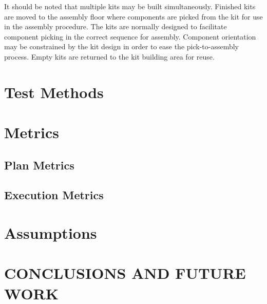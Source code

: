 It should be noted that multiple kits may be built simultaneously. 
Finished kits are moved to the assembly floor where components
are picked from the kit for use in the assembly procedure. 
The kits are normally designed to facilitate component picking in the correct
sequence for assembly. Component orientation may be constrained 
by the kit design in order to ease the pick-to-assembly process.
Empty kits are returned to the kit building area for reuse.

\renewcommand{\topfraction}{1.0}
\setcounter{topnumber}{100}

\section{Test Methods}
\label{sect:TestMethods}




\section{Metrics}
\subsection{Plan Metrics}
\label{sect:PlanMetrics}

\subsection{Execution Metrics}
\label{sect:ExecutionMetrics}





\section{Assumptions}
\label{sect:Assumptions}


\addtolength{\textheight}{-15cm}   


\section{CONCLUSIONS AND FUTURE WORK}
\label{sect:Conclusions}






